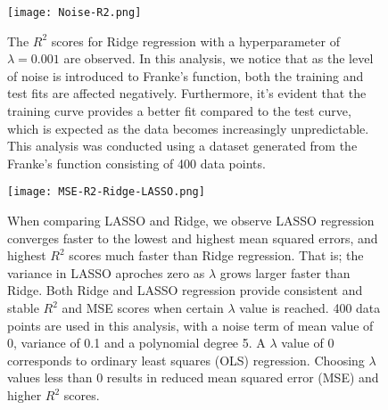 \documentclass[a4paper,12pt]{article}
\begin{document}
\begin{figure}[H]
\centerline{\texttt{[image: Noise-R2.png]}}
\caption{The $R^2$ scores for Ridge regression with a hyperparameter of $\lambda=0.001$ are observed. In this analysis, we notice that as the level of noise is introduced to Franke's function, both the training and test fits are affected negatively. Furthermore, it's evident that the training curve provides a better fit compared to the test curve, which is expected as the data becomes increasingly unpredictable. This analysis was conducted using a dataset generated from the Franke's function consisting of 400 data points. }
\label{fig}
\end{figure}



\begin{figure}[H]
\centerline{\texttt{[image: MSE-R2-Ridge-LASSO.png]}}
\caption{When comparing LASSO and Ridge, we observe LASSO regression converges faster to the lowest and highest mean squared errors, and highest $R^2$ scores much faster than Ridge regression. That is; the variance in LASSO aproches zero as $\lambda$ grows larger faster than Ridge. Both Ridge and LASSO regression provide consistent and stable $R^2$ and MSE scores when certain $\lambda$ value is reached. 400 data points are used in this analysis, with a noise term of mean value of 0, variance of 0.1 and a polynomial degree 5. A $\lambda$ value of 0 corresponds to ordinary least squares (OLS) regression. Choosing $\lambda$ values less than 0 results in reduced mean squared error (MSE) and higher $R^2$ scores.}
\label{fig}
\end{figure}
\end{document}

